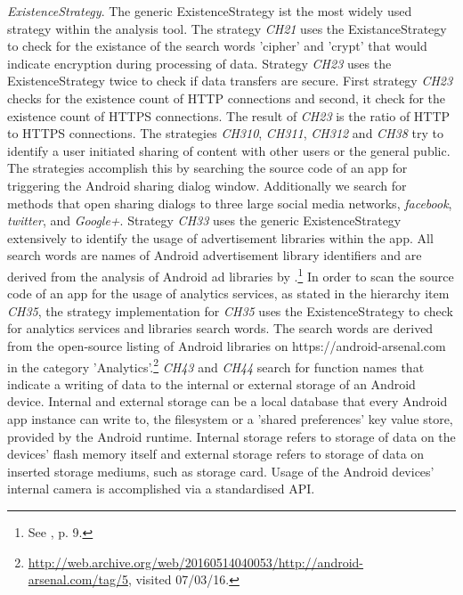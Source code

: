 \textit{ExistenceStrategy}.
The generic ExistenceStrategy ist the most widely used strategy within the analysis tool.
The strategy \textit{CH21} uses the ExistanceStrategy to check for the existance of the search words 'cipher' and 'crypt' that would indicate encryption during processing of data.
Strategy \textit{CH23} uses the ExistenceStrategy twice to check if data transfers are secure. 
First strategy \textit{CH23} checks for the existence count of HTTP connections and second, it check for the existence count of HTTPS connections.
The result of \textit{CH23} is the ratio of \acs{HTTP} to \acs{HTTPS} connections.
The strategies \textit{CH310}, \textit{CH311}, \textit{CH312} and \textit{CH38} try to identify a user initiated sharing of content with other users or the general public.
The strategies accomplish this by searching the source code of an app for triggering the Android sharing dialog window.
Additionally we search for methods that open sharing dialogs to three large social media networks, \textit{facebook}, \textit{twitter}, and \textit{Google+}.
Strategy \textit{CH33} uses the generic ExistenceStrategy extensively to identify the usage of advertisement libraries within the app.
All search words are names of Android advertisement library identifiers and are derived from the analysis of Android ad libraries by \cite{Book2013}.\footnote{See \cite{Book2013}, p. 9.}
In order to scan the source code of an app for the usage of analytics services, as stated in the hierarchy item \textit{CH35}, the strategy implementation for \textit{CH35} uses the ExistenceStrategy to check for analytics services and libraries search words.
The search words are derived from the open-source listing of Android libraries on https://android-arsenal.com in the category 'Analytics'.\footnote{\url{http://web.archive.org/web/20160514040053/http://android-arsenal.com/tag/5}, visited 07/03/16.}
\textit{CH43} and \textit{CH44} search for function names that indicate a writing of data to the internal or external storage of an Android device.
Internal and external storage can be a local database that every Android app instance can write to, the filesystem or a 'shared preferences' key value store, provided by the Android runtime.
Internal storage refers to storage of data on the devices' flash memory itself and external storage refers to storage of data on inserted storage mediums, such as storage card.
Usage of the Android devices' internal camera is accomplished via a standardised \acs{API}.
